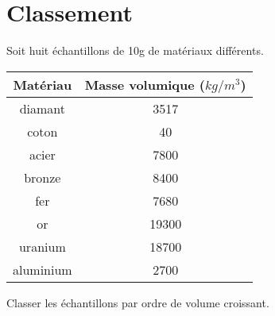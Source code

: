 \section{Classement}\label{ex:classement}

Soit huit échantillons de 10g de matériaux différents.

{\small \begin{center}
	\begin{tabular}{|@{\ }c@{\ }|@{\ }c@{\ }|}
		\hline
		\textbf{Matériau}  & \textbf{Masse volumique ($kg/m^3$)} \\ \hline
		diamant   & \num{3517}                 \\ \hline
		coton     & \num{40}                   \\ \hline
		acier     & \num{7800}                 \\ \hline
		bronze    & \num{8400}                 \\ \hline
		fer       & \num{7680}                 \\ \hline
		or        & \num{19300}                \\ \hline
		uranium   & \num{18700}                \\ \hline
		aluminium & \num{2700}                 \\ \hline
	\end{tabular}
\end{center}}

\begin{questions}
	\question Classer les échantillons par ordre de volume croissant.
	
\end{questions}